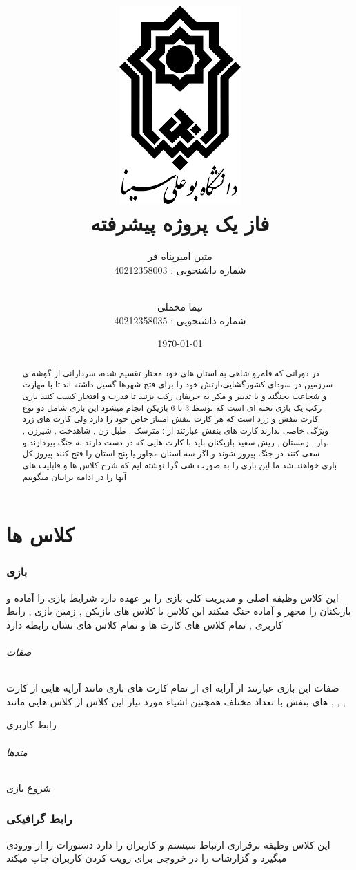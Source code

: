 \documentclass[pdf,titlepage,a4paper]{report}
\title{\includegraphics[scale=0.5]{Graphics/BASU_Logo_header.png} \\ \Huge{فاز یک پروژه پیشرفته}}
\author{متین امیرپناه فر \\ شماره داشنجویی : 40212358003  \and \\ نیما مخملی \\ شماره داشنجویی : 40212358035}
\date{\today}
\begin{document}
	\maketitle
	\tableofcontents
	
	\begin{abstract}
	 در دورانی که قلمرو شاهی به استان های خود مختار تقسیم شده،
	 سردارانی از گوشه ی سرزمین در سودای کشورگشایی،ارتش خود را برای فتح شهرها گسیل داشته اند.تا با مهارت و شجاعت بجنگند و با تدبیر و مکر به حریفان رکب بزنند تا قدرت و افتخار کسب کنند
	 بازی رکب یک بازی تخته ای است که توسط 3 تا 6 بازیکن انجام میشود 
	 این بازی شامل دو نوع کارت بنفش و زرد است که هر کارت بنفش امتیاز خاص خود را دارد ولی کارت های زرد ویژگی خاصی ندارند
	 کارت های بنفش عبارتند از : مترسک , طبل زن , شاهدخت ,  شیرزن  ,  بهار  , زمستان , ریش سفید 
	 بازیکنان باید با کارت هایی که در دست دارند به جنگ بپردازند و سعی کنند در جنگ پیروز شوند و اگر سه استان مجاور یا پنج استان را فتح کنند پیروز کل بازی خواهند شد 
	 ما این بازی را به صورت شی گرا نوشته ایم که شرح کلاس ها و قابلیت های آنها را در ادامه برایتان میگوییم 
	\end{abstract}


	\part{کلاس ها}
		
	\newpage
	\section{بازی}
	این کلاس وظیفه اصلی و مدیریت کلی بازی را بر عهده دارد شرایط بازی را آماده و بازیکنان را مجهز و آماده جنگ میکند
	این کلاس با کلاس های بازیکن , زمین بازی , رابط کاربری , تمام کلاس های کارت ها و تمام کلاس های نشان رابطه دارد
	\paragraph{صفات}
	صفات این بازی عبارتند از آرایه ای از تمام کارت های بازی مانند آرایه هایی از کارت های بنفش با تعداد مختلف
	همچنین اشیاء مورد نیاز این کلاس از کلاس هایی مانند  ,  ,  , 

	\subparagraph{رابط کاربری}
	\paragraph{متدها}
	\subparagraph{شروع بازی}
	
	
	\newpage
	\section{رابط گرافیکی}
	این کلاس وظیفه برقراری ارتباط سیستم و کاربران را دارد دستورات را از ورودی میگیرد و گزارشات را در خروجی برای رویت کردن کاربران چاپ میکند
\end{document}
